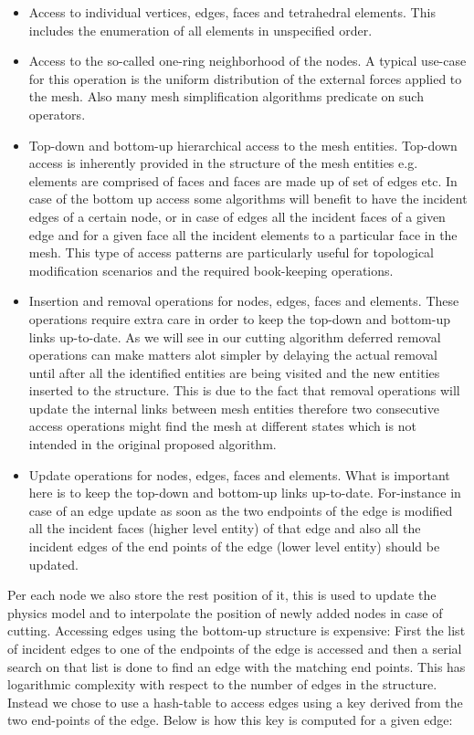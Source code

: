 \begin{itemize}
 \item Access to individual vertices, edges, faces and tetrahedral elements. This includes the enumeration of 
 all elements in unspecified order.
 
 \item Access to the so-called one-ring neighborhood of the nodes. A typical use-case for this operation is the uniform 
 distribution of the external forces applied to the mesh. Also many mesh simplification algorithms predicate on such operators.
 
 \item Top-down and bottom-up hierarchical access to the mesh entities. Top-down access is inherently provided in the structure of the
 mesh entities e.g. elements are comprised of faces and faces are made up of set of edges etc. In case of the bottom up access some algorithms 
 will benefit to have the incident edges of a certain node, or in case of edges all the incident faces of a given edge and for a given face
 all the incident elements to a particular face in the mesh. This type of access patterns are particularly useful for topological modification 
 scenarios and the required book-keeping operations.
 
 \item Insertion and removal operations for nodes, edges, faces and elements. These operations require extra care in order to keep
 the top-down and bottom-up links up-to-date. As we will see in our cutting algorithm deferred removal operations can make matters alot simpler by
 delaying the actual removal until after all the identified entities are being visited and the new entities inserted to the structure.
 This is due to the fact that removal operations will update the internal links between mesh entities therefore two consecutive access operations
 might find the mesh at different states which is not intended in the original proposed algorithm.
 
 \item Update operations for nodes, edges, faces and elements. What is important here is to keep the top-down and bottom-up links up-to-date. 
 For-instance in case of an edge update as soon as the two endpoints of the edge is modified all the incident faces (higher level entity) 
 of that edge and also all the incident edges of the end points of the edge (lower level entity) should be updated.
\end{itemize}

Per each node we also store the rest position of it, this is used to update the physics model and to interpolate the position 
of newly added nodes in case of cutting. Accessing edges using the bottom-up structure is expensive: First the list of incident 
edges to one of the endpoints of the edge is accessed and then a serial search on that list is done to find an edge with the matching 
end points. This has logarithmic complexity with respect to the number of edges in the structure. Instead we chose to use a hash-table
to access edges using a key derived from the two end-points of the edge. Below is how this key is computed for a given edge:

